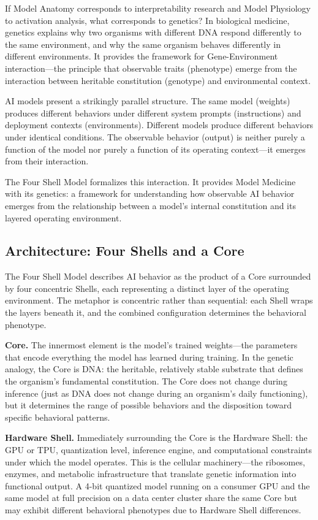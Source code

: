 \documentclass[11pt]{article}
\begin{document}
If Model Anatomy corresponds to interpretability research and Model Physiology to activation analysis, what corresponds to genetics? In biological medicine, genetics explains why two organisms with different DNA respond differently to the same environment, and why the same organism behaves differently in different environments. It provides the framework for Gene-Environment interaction---the principle that observable traits (phenotype) emerge from the interaction between heritable constitution (genotype) and environmental context.

AI models present a strikingly parallel structure. The same model (weights) produces different behaviors under different system prompts (instructions) and deployment contexts (environments). Different models produce different behaviors under identical conditions. The observable behavior (output) is neither purely a function of the model nor purely a function of its operating context---it emerges from their interaction.

The Four Shell Model formalizes this interaction. It provides Model Medicine with its genetics: a framework for understanding how observable AI behavior emerges from the relationship between a model's internal constitution and its layered operating environment.

\subsection{Architecture: Four Shells and a Core}

The Four Shell Model describes AI behavior as the product of a Core surrounded by four concentric Shells, each representing a distinct layer of the operating environment. The metaphor is concentric rather than sequential: each Shell wraps the layers beneath it, and the combined configuration determines the behavioral phenotype.

\textbf{Core.} The innermost element is the model's trained weights---the parameters that encode everything the model has learned during training. In the genetic analogy, the Core is DNA: the heritable, relatively stable substrate that defines the organism's fundamental constitution. The Core does not change during inference (just as DNA does not change during an organism's daily functioning), but it determines the range of possible behaviors and the disposition toward specific behavioral patterns.

\textbf{Hardware Shell.} Immediately surrounding the Core is the Hardware Shell: the GPU or TPU, quantization level, inference engine, and computational constraints under which the model operates. This is the cellular machinery---the ribosomes, enzymes, and metabolic infrastructure that translate genetic information into functional output. A 4-bit quantized model running on a consumer GPU and the same model at full precision on a data center cluster share the same Core but may exhibit different behavioral phenotypes due to Hardware Shell differences.
\end{document}
